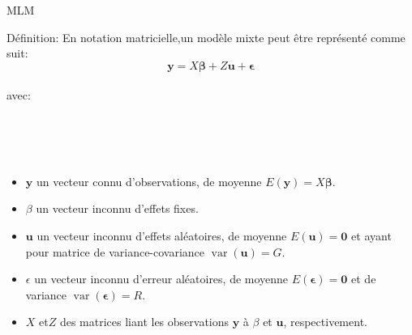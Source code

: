 \documentclass[unknownkeysallowed]{beamer}
\begin{document}
\begin{frame}{MLM}
   
  
  
\begin{alertblock}{Définition: }
En notation matricielle,un modèle mixte peut être représenté comme suit:
  $$\boldsymbol{y}=X \boldsymbol{\beta}+Z \boldsymbol{u}+\boldsymbol{\epsilon}$$\\
  avec:\\
 
  
   
\end {alertblock}
  
  \\ \\ \\
  
  
  \begin{itemize}\\ \\

   \item $\boldsymbol{y}$ un vecteur connu d'observations, de moyenne $E(\boldsymbol{y})=X\boldsymbol{\beta}$.
\\
   \item$\beta$ un vecteur inconnu d'effets fixes.\\
   \item$\boldsymbol{u}$ un vecteur inconnu d'effets aléatoires, de moyenne $E(\boldsymbol{u})=\mathbf{0}$ et ayant pour matrice de variance-covariance $\operatorname{var}(\boldsymbol{u})=G$. \\
   \item$\epsilon$  un vecteur inconnu d'erreur aléatoires, de moyenne $E(\boldsymbol{\epsilon})=\mathbf{0}$ et de variance $\operatorname{var}(\boldsymbol{\epsilon})=R$.\\
   \item$X$ et$Z$ des matrices liant les observations $\boldsymbol{y}$ à $\beta$ et $\boldsymbol{u}$, respectivement.\\ 
   \end{itemize}
\end{frame}
\end{document}
